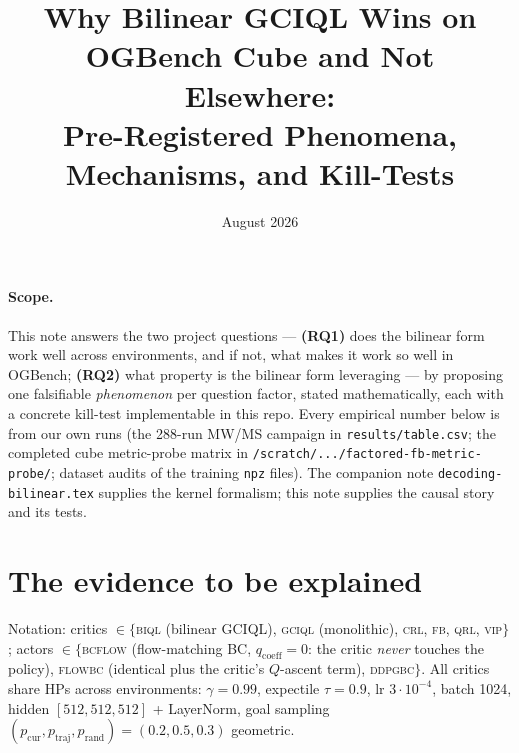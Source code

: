 \documentclass[10pt]{article}
\title{\vspace{-2em}Why Bilinear GCIQL Wins on OGBench Cube and Not Elsewhere:\\
Pre-Registered Phenomena, Mechanisms, and Kill-Tests}
\author{}
\date{August 2026}
\begin{document}
\maketitle
\vspace{-3em}

\paragraph{Scope.}
This note answers the two project questions --- \textbf{(RQ1)} does the bilinear form work
well across environments, and if not, what makes it work so well in OGBench; \textbf{(RQ2)}
what property is the bilinear form leveraging --- by proposing one falsifiable
\emph{phenomenon} per question factor, stated mathematically, each with a concrete kill-test
implementable in this repo. Every empirical number below is from our own runs (the
288-run MW/MS campaign in \texttt{results/table.csv}; the completed cube metric-probe matrix
in \texttt{/scratch/.../factored-fb-metric-probe/}; dataset audits of the training
\texttt{npz} files). The companion note \texttt{decoding-bilinear.tex} supplies the kernel
formalism; this note supplies the causal story and its tests.

\section{The evidence to be explained}\label{sec:evidence}

Notation: critics $\in\{$\textsc{biql} (bilinear GCIQL), \textsc{gciql} (monolithic),
\textsc{crl}, \textsc{fb}, \textsc{qrl}, \textsc{vip}$\}$; actors $\in\{$\textsc{bcflow}
(flow-matching BC, $q_{\mathrm{coeff}}{=}0$: the critic \emph{never} touches the policy),
\textsc{flowbc} (identical plus the critic's $Q$-ascent term), \textsc{ddpgbc}$\}$. All
critics share HPs across environments: $\gamma=0.99$, expectile $\tau=0.9$, lr $3{\cdot}10^{-4}$,
batch 1024, hidden $[512,512,512]$ + LayerNorm, goal sampling
$(p_{\mathrm{cur}},p_{\mathrm{traj}},p_{\mathrm{rand}})=(0.2,0.5,0.3)$ geometric.
\end{document}

